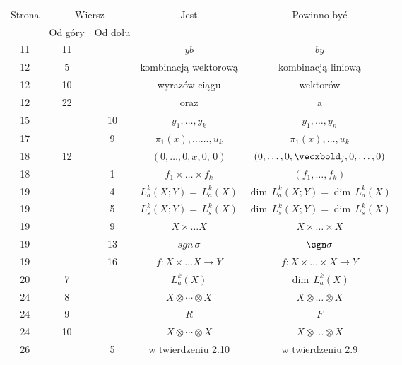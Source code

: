 \documentclass[a4paper,11pt]{article}
\numberwithin{equation}{section}
\begin{document}
\begin{center}

  \begin{tabular}{|c|c|c|c|c|}
    \hline
    Strona & \multicolumn{2}{c|}{Wiersz} & Jest
                              & Powinno być \\ \cline{2-3}
    & Od góry & Od dołu & & \\
    \hline
    11  & 11 & & $y b$ & $b y$ \\
    12  & \hphantom{0}5 & & kombinacją wektorową &  kombinacją liniową \\
    12  & 10 & & wyrazów ciągu & wektorów \\
    12  & 22 & & oraz & a \\
    15  & & 10 & $y_{ 1 }, \ldots , y_{ k }$ & $y_{ 1 }, \ldots , y_{ n }$ \\
    17  & & \hphantom{0}9 & $\pi_{ 1 }( x ), \ldots\ldots, u_{ k }$
           & $\pi_{ 1 }( x ), \ldots, u_{ k }$ \\
    18  & 12 & & $( 0, \ldots, 0, x, 0, \, 0 )$
           & $( 0, \ldots, 0, \vecxbold_{ j }, 0, \ldots, 0 )$ \\
    18  & & \hphantom{0}1 & $f_{ 1 } \times \ldots \times f_{ k }$
    & $( f_{ 1 }, \ldots, f_{ k } )$ \\
    19  & & \hphantom{0}4 & $L^{ k }_{ a } ( X; Y ) = \, L^{ k }_{ a } ( X )$
    & $\dim \, L^{ k }_{ a } ( X; Y ) = \dim \, L^{ k }_{ a } ( X )$ \\
    19  & & \hphantom{0}5 & $L^{ k }_{ s } ( X; Y ) = \, L^{ k }_{ s } ( X )$
    & $\dim \, L^{ k }_{ s } ( X; Y ) = \dim \, L^{ k }_{ s } ( X )$ \\
    19  & & \hphantom{0}9 & $X \times \ldots X$ & $X \times \ldots \times X$ \\
    19  & & 13 & $sgn\, \sigma$ & $\sgn \sigma$ \\
    19  & & 16 & $f : X \times \ldots X \to Y$ & $f : X \times \ldots \times X \to Y$ \\
    20  & \hphantom{0}7 & & $L_{ a }^{ k }( X )$
    & $\dim \, L_{ a }^{ k }( X )$ \\
    24  & \hphantom{0}8 & & $X \otimes \cdots \otimes X$ & $X \otimes \ldots \otimes X$ \\
    24  & \hphantom{0}9 & & $R$ & $F$ \\
    24  & 10 & & $X \otimes \cdots \otimes X$ & $X \otimes \ldots \otimes X$ \\
    26  & &  5 & w twierdzeniu 2.10 & w twierdzeniu 2.9 \\

\end{tabular}
\end{center}
\end{document}
